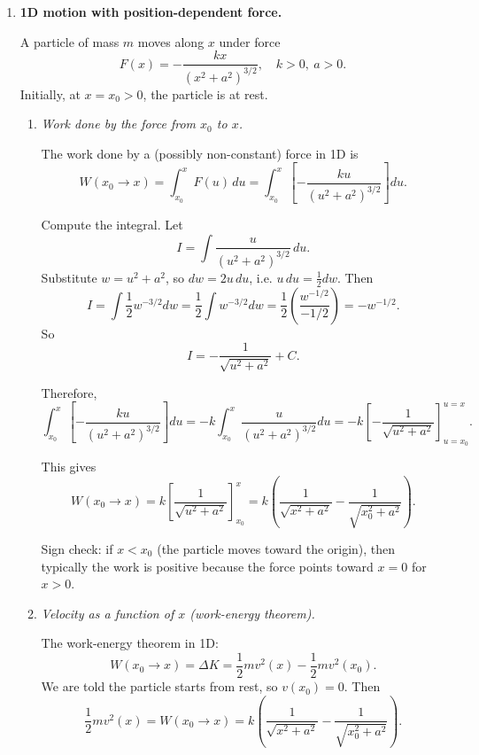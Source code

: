 \documentclass[12pt]{article}
\begin{document}
\begin{enumerate}
If the package is thrown at speed $|\vec{v}_p|$ and angle $\theta$ above the horizontal, then
\[
v_{px} = |\vec{v}_p| \cos\theta,
\qquad
v_{py} = |\vec{v}_p| \sin\theta.
\]

Physically: the boat recoils so that the center of mass of (boat+child+package) keeps the same velocity that it had just before the throw.


\item \textbf{1D motion with position-dependent force.}

A particle of mass $m$ moves along $x$ under force
\[
F(x) = - \frac{k x}{(x^2 + a^2)^{3/2}},
\quad k>0,\ a>0.
\]
Initially, at $x=x_0>0$, the particle is at rest.

\begin{enumerate}
    \item \textit{Work done by the force from $x_0$ to $x$.}

    The work done by a (possibly non-constant) force in 1D is
    \[
    W(x_0 \to x) = \int_{x_0}^{x} F(u)\,du
    = \int_{x_0}^{x} 
    \left[- \frac{k u}{(u^2 + a^2)^{3/2}} \right] du.
    \]

    Compute the integral. Let
    \[
    I = \int \frac{u}{(u^2 + a^2)^{3/2}} \, du.
    \]
    Substitute $w = u^2 + a^2$, so $dw = 2u\,du$, i.e. $u\,du = \frac{1}{2}dw$. Then
    \[
    I = \int \frac{1}{2} w^{-3/2} dw
    = \frac{1}{2} \int w^{-3/2} dw
    = \frac{1}{2} \left( \frac{w^{-1/2}}{-1/2} \right)
    = - w^{-1/2}.
    \]
    So
    \[
    I = - \frac{1}{\sqrt{u^2 + a^2}} + C.
    \]

    Therefore,
    \[
    \int_{x_0}^{x} 
    \left[- \frac{k u}{(u^2 + a^2)^{3/2}} \right] du
    = -k \int_{x_0}^{x} \frac{u}{(u^2 + a^2)^{3/2}} du
    = -k \left[ - \frac{1}{\sqrt{u^2 + a^2}} \right]_{u=x_0}^{u=x}.
    \]

    This gives
    \[
    W(x_0 \to x)
    = k \left[ \frac{1}{\sqrt{u^2 + a^2}} \right]_{x_0}^{x}
    = k \left( \frac{1}{\sqrt{x^2 + a^2}} - \frac{1}{\sqrt{x_0^2 + a^2}} \right).
    \]

    Sign check: if $x < x_0$ (the particle moves toward the origin), then typically the work is positive because the force points toward $x=0$ for $x>0$.

    \item \textit{Velocity as a function of $x$ (work-energy theorem).}

    The work-energy theorem in 1D:
    \[
    W(x_0 \to x) = \Delta K = \frac{1}{2} m v^2(x) - \frac{1}{2} m v^2(x_0).
    \]
    We are told the particle starts from rest, so $v(x_0)=0$. Then
    \[
    \frac{1}{2} m v^2(x)
    = W(x_0 \to x)
    = k \left( \frac{1}{\sqrt{x^2 + a^2}} - \frac{1}{\sqrt{x_0^2 + a^2}} \right).
    \]


\end{enumerate}
\end{enumerate}
\end{document}

